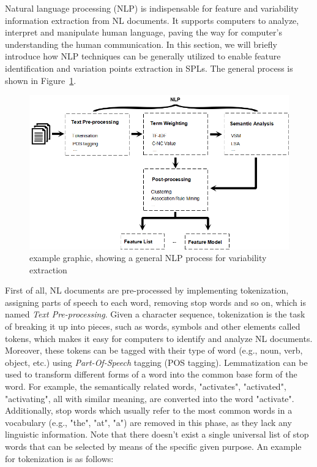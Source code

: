 \documentclass[graybox]{svmult}
\begin{document}
Natural language processing (NLP) is indispensable for feature and variability information extraction from NL documents. It supports computers to analyze, interpret and manipulate human language, paving the way for computer's understanding the human communication. In this section, we will briefly introduce how NLP techniques can be generally utilized to enable feature identification and variation points extraction in SPLs. The general process is shown in Figure~\ref{fig:nlp-general}.

\begin{figure}
\centering
\includegraphics[scale=0.55]{fig_nlp2}
\caption{example graphic, showing a general NLP process for variability extraction}
\label{fig:nlp-general}
\end{figure}

First of all, NL documents are pre-processed by implementing tokenization, assigning parts of speech to each word, removing stop words and so on, which is named \textit{Text Pre-processing}. Given a character sequence, tokenization is the task of breaking it up into pieces, such as words, symbols and other elements called tokens, which makes it easy for computers to identify and analyze NL documents. Moreover, these tokens can be tagged with their type of word (e.g., noun, verb, object, etc.) using \textit{Part-Of-Speech} tagging (POS tagging). Lemmatization can be used to transform different forms of a word into the common base form of the word. For example, the semantically related words, "activates", "activated", "activating", all with similar meaning, are converted into the word "activate". Additionally, stop words which usually refer to the most common words in a vocabulary (e.g., "the", "at", "a") are removed in this phase, as they lack any linguistic information. Note that there doesn't exist a single universal list of stop words that can be selected by means of the specific given purpose. An example for tokenization is as follows:
\end{document}

